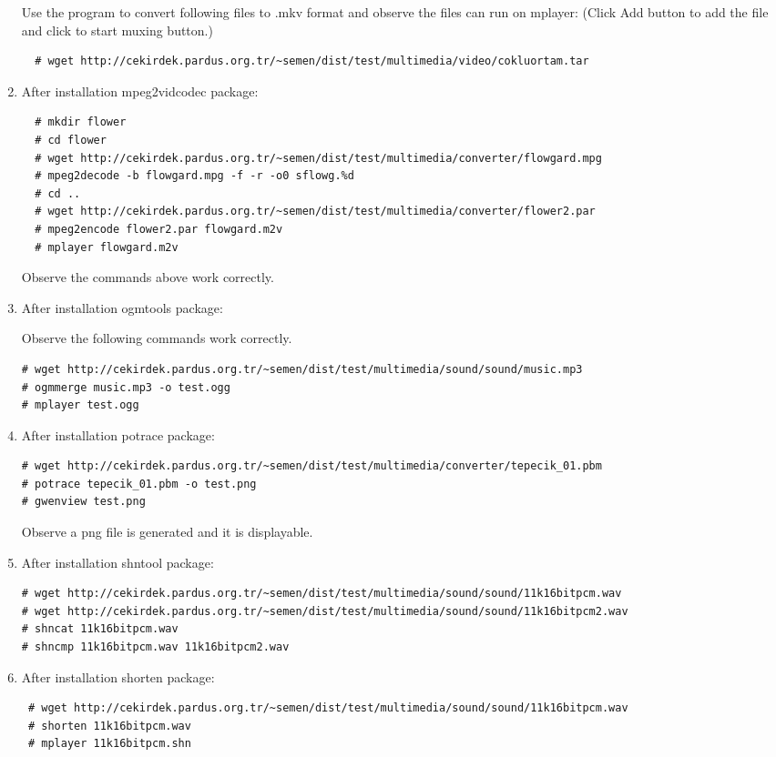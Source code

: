 \documentclass[a4paper,10pt]{article}
\begin{document}
\begin{enumerate}
Use the program to convert following files to .mkv format and observe the files can run on mplayer: (Click Add button to add the file and click to start muxing button.)
\begin{verbatim}
  # wget http://cekirdek.pardus.org.tr/~semen/dist/test/multimedia/video/cokluortam.tar
 \end{verbatim}

\item After installation mpeg2vidcodec package:
\begin{verbatim}
  # mkdir flower
  # cd flower
  # wget http://cekirdek.pardus.org.tr/~semen/dist/test/multimedia/converter/flowgard.mpg
  # mpeg2decode -b flowgard.mpg -f -r -o0 sflowg.%d
  # cd ..
  # wget http://cekirdek.pardus.org.tr/~semen/dist/test/multimedia/converter/flower2.par
  # mpeg2encode flower2.par flowgard.m2v
  # mplayer flowgard.m2v
\end{verbatim}

Observe the commands above work correctly.
\item After installation ogmtools package:

Observe the following commands work correctly.
\begin{verbatim}
# wget http://cekirdek.pardus.org.tr/~semen/dist/test/multimedia/sound/sound/music.mp3 
# ogmmerge music.mp3 -o test.ogg
# mplayer test.ogg
\end{verbatim}

\item After installation potrace package:
\begin{verbatim}
# wget http://cekirdek.pardus.org.tr/~semen/dist/test/multimedia/converter/tepecik_01.pbm 
# potrace tepecik_01.pbm -o test.png
# gwenview test.png
\end{verbatim}

Observe a png file is generated and it is displayable.

\item After installation shntool package:
\begin{verbatim}
# wget http://cekirdek.pardus.org.tr/~semen/dist/test/multimedia/sound/sound/11k16bitpcm.wav
# wget http://cekirdek.pardus.org.tr/~semen/dist/test/multimedia/sound/sound/11k16bitpcm2.wav
# shncat 11k16bitpcm.wav
# shncmp 11k16bitpcm.wav 11k16bitpcm2.wav
\end{verbatim}
\item After installation shorten package:
\begin{verbatim}
 # wget http://cekirdek.pardus.org.tr/~semen/dist/test/multimedia/sound/sound/11k16bitpcm.wav
 # shorten 11k16bitpcm.wav
 # mplayer 11k16bitpcm.shn
\end{verbatim}


\end{enumerate}
\end{document}
